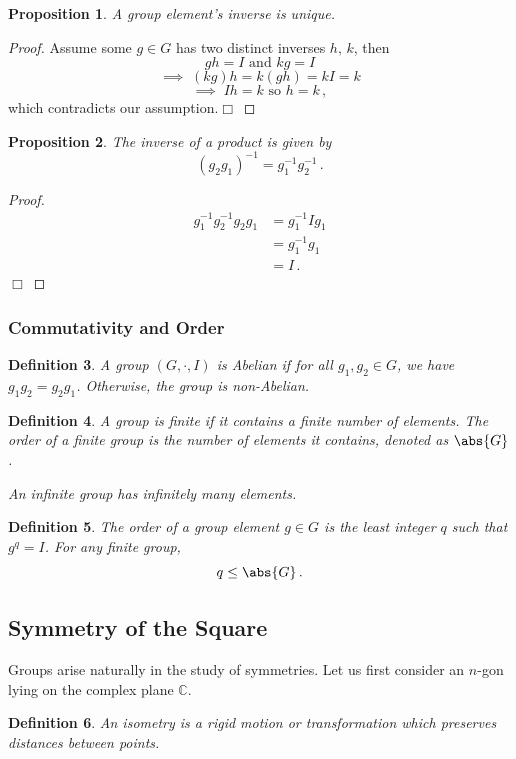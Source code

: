 \documentclass{article}
\theoremstyle{plain}\theoremheaderfont{\normalfont\itshape}\theorembodyfont{\rmfamily}\theoremseparator{.}\newtheorem*{rem}{Remark}\newtheorem*{ex}{Example}\newtheorem*{proof}{Proof}\newtheorem*{altp}{Alternative proof}
\theoremstyle{plain}\theoremheaderfont{\normalfont\bfseries}\theorembodyfont{\rmfamily}\theoremseparator{.}\newtheorem{thm}{Theorem}[section]\newtheorem{lem}[thm]{Lemma}\newtheorem{prop}[thm]{Proposition}\newtheorem*{cor}{Corollary}\newtheorem{defn}[thm]{Definition}\newtheorem{clm}[thm]{Claim}\newtheorem{clminproof}{Claim}
\theoremstyle{break}\theoremheaderfont{\normalfont\itshape}\theorembodyfont{\rmfamily}\theoremseparator{.\medskip}\newtheorem*{proofskip}{Proof}\newtheorem*{exs}{Examples}\newtheorem*{rems}{Remarks}
\theoremstyle{break}\theoremheaderfont{\normalfont\bfseries}\theorembodyfont{\rmfamily}\theoremseparator{.\medskip}\newtheorem{lemskip}[thm]{Lemma}\newtheorem{defnskip}[thm]{Definition}\newtheorem{propskip}[thm]{Proposition}\newtheorem{thmskip}[thm]{Theorem}
\numberwithin{equation}{section}
\newcommand{\qed}{\hfill\ensuremath{\Box}}
\begin{document}
	\begin{prop}
		A group element's inverse is unique.
	\end{prop}
	\begin{proof}
		Assume some \(g\in G\) has two distinct inverses \(h,\, k\), then
		\[gh=I\text{ and }kg=I\]
		\[\implies\;(kg)h=k(gh)=kI=k\]
		\[\implies\;Ih=k \text{ so }h=k\,,\]
		which contradicts our assumption.\qed
	\end{proof}
	
	\begin{prop}
		The inverse of a product is given by
		\[(g_2g_1)^{-1}=g_{1}^{-1}g_{2}^{-1}\,.\]
	\end{prop}
	\begin{proof}
		\begin{align*}
			g_{1}^{-1}g_{2}^{-1}g_2g_1&=g_{1}^{-1}Ig_1\\
			&=g_1^{-1}g_1\\
			&=I\,.
		\end{align*}\qed
	\end{proof}
	
	\subsubsection{Commutativity and Order}
	\begin{defn}
		A group \((G,\cdot,I)\) is \textit{Abelian} if for all \(g_1,g_2\in G\), we have \(g_1g_2=g_2g_1\). Otherwise, the group is \textit{non-Abelian}.
	\end{defn}
	\begin{defn}
		A group is \textit{finite} if it contains a finite number of elements. The \textit{order} of a finite group is the number of elements it contains, denoted as \(\abs{G}\).
		
		An \textit{infinite group} has infinitely many elements.
	\end{defn}
	\begin{defn}
		The \textit{order} of a group element \(g\in G\) is the least integer \(q\) such that \(g^q=I\). For any finite group,
		\[q\le\abs{G}\,.\]
	\end{defn}
	
	\subsection{Symmetry of the Square}
	Groups arise naturally in the study of symmetries. Let us first consider an \(n\)-gon lying on the complex plane \(\mathbb{C}\).
	\begin{defn}
		An \textit{isometry} is a rigid motion or transformation which preserves distances between points.
	\end{defn}
\end{document}
